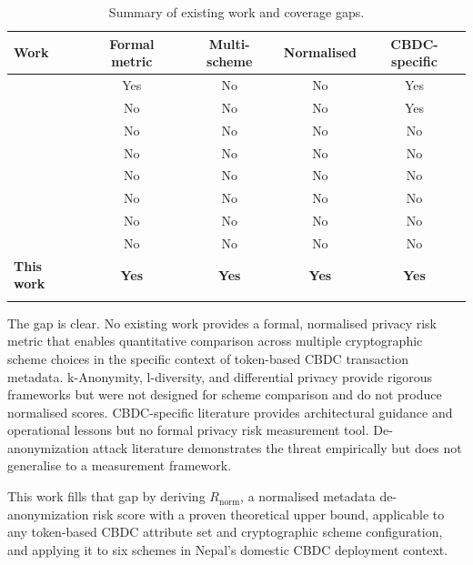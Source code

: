 \begin{table}[tbp]
\caption{Summary of existing work and coverage gaps.}%
\label{tab:gap}
\begin{tabular}{lcccc}
\toprule
\textbf{Work} &
\textbf{Formal metric} &
\textbf{Multi-scheme} &
\textbf{Normalised} &
\textbf{CBDC-specific} \\
\midrule
\cite{biscgide2024}        & Yes      & No      & No  & Yes  \\
\cite{moralesresendiz2021}  & No       & No      & No  & Yes  \\
\cite{garratt2020}          & No       & No      & No  & No   \\
\cite{koshy2014}           & No       & No      & No  & No   \\
\cite{chaum1983}           & No       & No      & No  & No   \\
\cite{asghar2011}          & No       & No      & No  & No   \\
\cite{vansaberhagen2013}   & No       & No      & No  & No   \\
\cite{noether2015}         & No       & No      & No  & No   \\
\textbf{This work}          & \textbf{Yes} & \textbf{Yes} &
\textbf{Yes} & \textbf{Yes} \\
\bottomrule
\addlinespace
\end{tabular}
\end{table}

The gap is clear. No existing work provides a formal,
normalised privacy risk metric that enables quantitative
comparison across multiple cryptographic scheme choices
in the specific context of token-based CBDC transaction
metadata. k-Anonymity, l-diversity, and differential
privacy provide rigorous frameworks but were not designed
for scheme comparison and do not produce normalised scores.
CBDC-specific literature provides architectural guidance
and operational lessons but no formal privacy risk
measurement tool. De-anonymization attack literature
demonstrates the threat empirically but does not generalise
to a measurement framework.

This work fills that gap by deriving $R_{\mathrm{norm}}$,
a normalised metadata de-anonymization risk score with
a proven theoretical upper bound, applicable to any
token-based CBDC attribute set and cryptographic scheme
configuration, and applying it to six schemes in Nepal's
domestic CBDC deployment context.